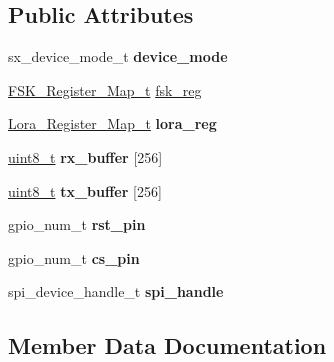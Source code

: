 \subsection*{Public Attributes}
\begin{DoxyCompactItemize}
\item 
\mbox{\label{structSX1276__Driver_a5701ddcbefc6cb361fc9cd0c5219bfc0}} 
sx\+\_\+device\+\_\+mode\+\_\+t {\bfseries device\+\_\+mode}
\item 
\hyperlink{structFSK__Register__Map}{F\+S\+K\+\_\+\+Register\+\_\+\+Map\+\_\+t} \hyperlink{structSX1276__Driver_af495c11033101af1032dcc76ac417492}{fsk\+\_\+reg}
\item 
\mbox{\label{structSX1276__Driver_a2a2ded4a0e724abbefb8015bd12793af}} 
\hyperlink{structFSK__Register__Map}{Lora\+\_\+\+Register\+\_\+\+Map\+\_\+t} {\bfseries lora\+\_\+reg}
\item 
\mbox{\label{structSX1276__Driver_aee4ec2364cc511eb360d318dbeb8152b}} 
\hyperlink{vl53l0x__types_8h_aba7bc1797add20fe3efdf37ced1182c5}{uint8\+\_\+t} {\bfseries rx\+\_\+buffer} \mbox{[}256\mbox{]}
\item 
\mbox{\label{structSX1276__Driver_ab6f0bc93cd9588cb5911ef4613934f24}} 
\hyperlink{vl53l0x__types_8h_aba7bc1797add20fe3efdf37ced1182c5}{uint8\+\_\+t} {\bfseries tx\+\_\+buffer} \mbox{[}256\mbox{]}
\item 
\mbox{\label{structSX1276__Driver_ab673c55b14bec71245b4d0bd53b410ff}} 
gpio\+\_\+num\+\_\+t {\bfseries rst\+\_\+pin}
\item 
\mbox{\label{structSX1276__Driver_a4ebc0dbd963b6262e30a63f9994111a7}} 
gpio\+\_\+num\+\_\+t {\bfseries cs\+\_\+pin}
\item 
\mbox{\label{structSX1276__Driver_a0e8828cf84ed41834d6d2fb025d67294}} 
spi\+\_\+device\+\_\+handle\+\_\+t {\bfseries spi\+\_\+handle}
\end{DoxyCompactItemize}


\subsection{Member Data Documentation}
\mbox{\label{structSX1276__Driver_af495c11033101af1032dcc76ac417492}} 
